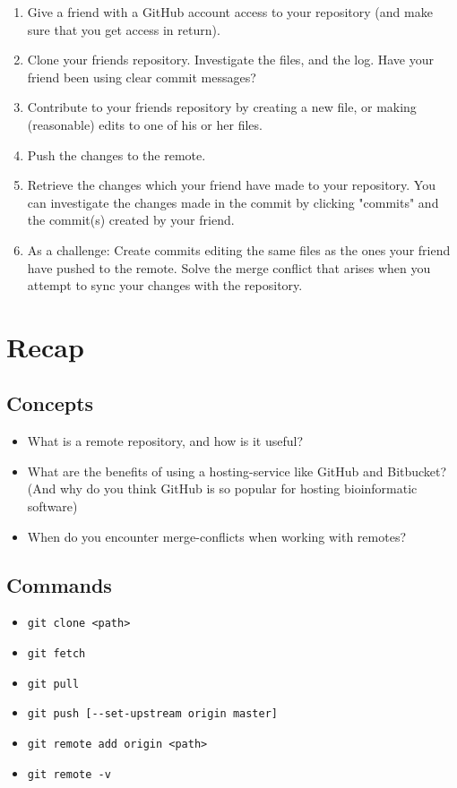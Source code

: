 \documentclass[../main/git_course_main.tex]{subfiles}
\begin{document}
\begin{enumerate}
\item Give a friend with a GitHub account access to your repository (and make sure that you get access in return).
\item Clone your friends repository. Investigate the files, and the log. Have your friend been using clear commit messages?
\item Contribute to your friends repository by creating a new file, or making (reasonable) edits to one of his or her files.
\item Push the changes to the remote.
\item Retrieve the changes which your friend have made to your repository. You can investigate the changes made in the commit by clicking "commits" and the commit(s) created by your friend.
\item As a challenge: Create commits editing the same files as the ones your friend have pushed to the remote. Solve the merge conflict that arises when you attempt to sync your changes with the repository.
\end{enumerate}

\newpage
\section{Recap}

\subsection{Concepts}

\begin{itemize}
	\item What is a remote repository, and how is it useful?
	\item What are the benefits of using a hosting-service like GitHub and Bitbucket? (And why do you think GitHub is so popular for hosting bioinformatic software)
	\item When do you encounter merge-conflicts when working with remotes?
\end{itemize}

\subsection{Commands}

\begin{itemize}
	\item \verb$git clone <path>$
	\item \verb$git fetch$
	\item \verb$git pull$
	\item \verb$git push [--set-upstream origin master]$
	\item \verb$git remote add origin <path>$
	\item \verb$git remote -v$
\end{itemize}
\end{document}
